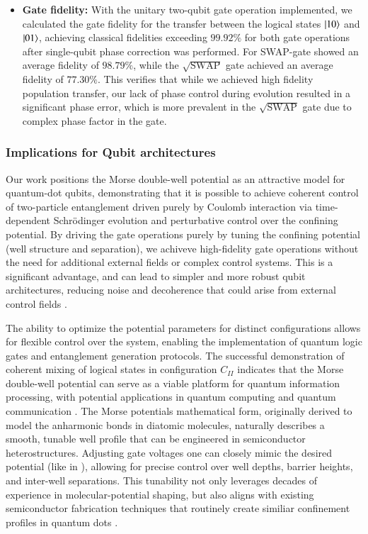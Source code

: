 \documentclass{subfiles}
\begin{document}
\begin{itemize}
    \item \textbf{Gate fidelity:} With the unitary two-qubit gate operation implemented, we calculated the gate fidelity for the transfer between the logical states $\ket{10}$ and $\ket{01}$, achieving classical fidelities exceeding $99.92\%$ for both gate operations after single-qubit phase correction was performed. For SWAP-gate showed an average fidelity of $98.79\%$, while the $\sqrt{\text{SWAP}}$ gate achieved an average fidelity of $77.30\%$. This verifies that while we achieved high fidelity population transfer, our lack of phase control during evolution resulted in a significant phase error, which is more prevalent in the $\sqrt{\text{SWAP}}$ gate due to complex phase factor in the gate.
\end{itemize}

\subsubsection*{Implications for Qubit architectures}
Our work positions the Morse double-well potential as an attractive model for quantum-dot qubits, demonstrating that it is possible to achieve coherent control of two-particle entanglement driven purely by Coulomb interaction via time-dependent Schrödinger evolution and perturbative control over the confining potential. By driving the gate operations purely by tuning the confining potential (well structure and separation), we achiveve high-fidelity gate operations without the need for additional external fields or complex control systems. This is a significant advantage, and can lead to simpler and more robust qubit architectures, reducing noise and decoherence that could arise from external control fields \cite{petta2005coherent, kuhlmann2013charge, yoneda2018quantum}.

The ability to optimize the potential parameters for distinct configurations allows for flexible control over the system, enabling the implementation of quantum logic gates and entanglement generation protocols. The successful demonstration of coherent mixing of logical states in configuration $C_{II}$ indicates that the Morse double-well potential can serve as a viable platform for quantum information processing, with potential applications in quantum computing and quantum communication \cite{nielsen2010quantum}. The Morse potentials mathematical form, originally derived to model the anharmonic bonds in diatomic molecules\cite{morse1929diatomic}, naturally describes a smooth, tunable well profile that can be engineered in semiconductor heterostructures. Adjusting gate voltages one can closely mimic the desired potential (like in \cite{leinonen2024coulomb}), allowing for precise control over well depths, barrier heights, and inter-well separations. This tunability not only leverages decades of experience in molecular-potential shaping, but also aligns with existing semiconductor fabrication techniques that routinely create similiar confinement profiles in quantum dots \cite{jacak2013quantum, garcia2021semiconductor}.
\end{document}
